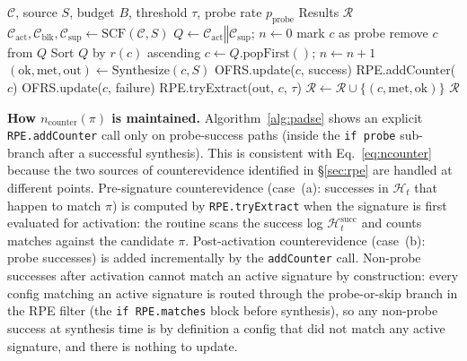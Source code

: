 \documentclass[journal]{IEEEtran}
\begin{document}
\begin{algorithm}[!htbp]
\caption{FA-DSE Exploration Policy}
\label{alg:padse}
\begin{algorithmic}[1]
\REQUIRE $\mathcal{C}$, source $S$, budget $B$, threshold $\tau$, probe rate $p_{\text{probe}}$
\ENSURE Results $\mathcal{R}$
\STATE $\mathcal{C}_{\text{act}}, \mathcal{C}_{\text{blk}}, \mathcal{C}_{\text{sup}} \leftarrow \text{SCF}(\mathcal{C}, S)$
\STATE $Q \leftarrow \mathcal{C}_{\text{act}} \mathbin\Vert \mathcal{C}_{\text{sup}}$; $n \leftarrow 0$ 
                \STATE mark $c$ as probe
            \ELSE
                \STATE remove $c$ from $Q$ 
            \ENDIF
        \ENDIF
    \ENDFOR
    \STATE Sort $Q$ by $r(c)$ ascending 
    \STATE $c \leftarrow Q.\text{popFirst}()$; $n \leftarrow n + 1$
    \STATE $(\text{ok}, \text{met}, \text{out}) \leftarrow \text{Synthesize}(c, S)$
        \STATE OFRS.update($c$, success)
            \STATE RPE.addCounter($c$)
        \ENDIF
    \ELSE
        \STATE OFRS.update($c$, failure)
        \STATE RPE.tryExtract(out, $c$, $\tau$)
    \ENDIF
    \STATE $\mathcal{R} \leftarrow \mathcal{R} \cup \{(c, \text{met}, \text{ok})\}$
\ENDWHILE
\RETURN $\mathcal{R}$
\end{algorithmic}
\end{algorithm}

\textbf{How $n_{\text{counter}}(\pi)$ is maintained.} Algorithm~\ref{alg:padse} shows an explicit \texttt{RPE.addCounter} call only on probe-success paths (inside the \texttt{if probe} sub-branch after a successful synthesis). This is consistent with Eq.~\ref{eq:ncounter} because the two sources of counterevidence identified in \S\ref{sec:rpe} are handled at different points. Pre-signature counterevidence (case~(a): successes in $\mathcal{H}_t$ that happen to match $\pi$) is computed by \texttt{RPE.tryExtract} when the signature is first evaluated for activation: the routine scans the success log $\mathcal{H}_t^{\text{succ}}$ and counts matches against the candidate $\pi$. Post-activation counterevidence (case~(b): probe successes) is added incrementally by the \texttt{addCounter} call. Non-probe successes after activation cannot match an active signature by construction: every config matching an active signature is routed through the probe-or-skip branch in the RPE filter (the \texttt{if RPE.matches} block before synthesis), so any non-probe success at synthesis time is by definition a config that did not match any active signature, and there is nothing to update.
\end{document}
